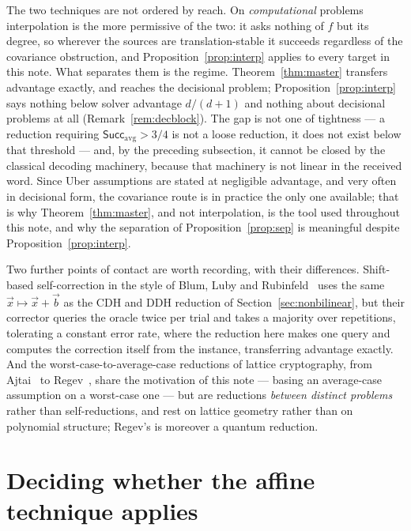 \documentclass{aicr-solution}
\newcommand{\vx}{\vec{x}}
\newcommand{\vb}{\vec{b}}
\newcommand{\Succ}{\mathsf{Succ}}
\begin{document}
The two techniques are not ordered by reach. On \emph{computational} problems interpolation is
the more permissive of the two: it asks nothing of $f$ but its degree, so wherever the sources
are translation-stable it succeeds regardless of the covariance obstruction, and
Proposition~\ref{prop:interp} applies to every target in this note. What separates them is the
regime. Theorem~\ref{thm:master} transfers advantage exactly, and reaches the decisional
problem; Proposition~\ref{prop:interp} says nothing below solver advantage $d/(d+1)$ and
nothing about decisional problems at all (Remark~\ref{rem:decblock}). The gap is not one of
tightness --- a reduction
requiring $\Succ_{\mathrm{avg}}>3/4$ is not a loose reduction, it does not exist below that
threshold --- and, by the preceding subsection, it cannot be closed by the classical decoding
machinery, because that machinery is not linear in the received word. Since Uber assumptions
are stated at negligible advantage, and very often in decisional form, the covariance route is
in practice the only one available; that is why Theorem~\ref{thm:master}, and not
interpolation, is the tool used throughout this note, and why the separation of
Proposition~\ref{prop:sep} is meaningful despite Proposition~\ref{prop:interp}.

Two further points of contact are worth recording, with their differences. Shift-based
self-correction in the style of Blum, Luby and Rubinfeld~\cite{BLR93} uses the same
$\vx\mapsto\vx+\vb$ as the CDH and DDH reduction of Section~\ref{sec:nonbilinear}, but their
corrector queries the oracle twice per trial and takes a majority over repetitions, tolerating
a constant error rate, where the reduction here makes one query and computes the correction
itself from the instance, transferring advantage exactly. And the worst-case-to-average-case
reductions of lattice cryptography, from Ajtai~\cite{Ajtai96} to Regev~\cite{Regev09}, share
the motivation of this note --- basing an average-case assumption on a worst-case one --- but
are reductions \emph{between distinct problems} rather than self-reductions, and rest on
lattice geometry rather than on polynomial structure; Regev's is moreover a quantum reduction.

\section{Deciding whether the affine technique applies}
\label{sec:decide}
\end{document}
